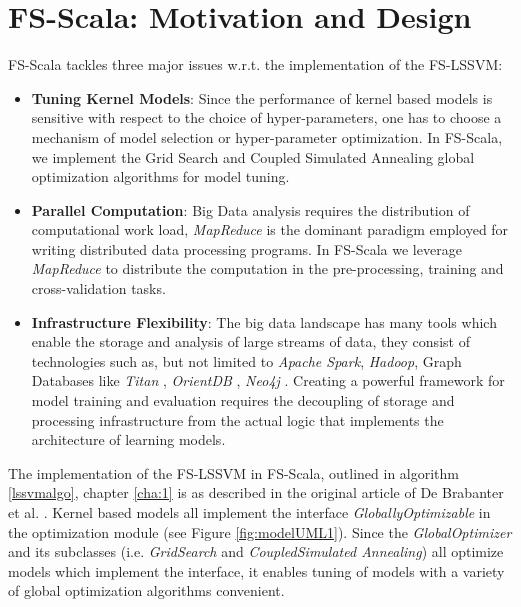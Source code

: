 \section{FS-Scala: Motivation and Design}
FS-Scala tackles three major issues w.r.t. the implementation of the FS-LSSVM:

\begin{itemize}
\item \textbf{Tuning Kernel Models}:
Since the performance of kernel based models is sensitive with respect to the choice of hyper-parameters, one has to choose a mechanism of model selection or hyper-parameter optimization. In FS-Scala, we implement the Grid Search and Coupled Simulated Annealing global optimization algorithms for model tuning.

\item \textbf{Parallel Computation}\label{mr}:
Big Data analysis requires the distribution of computational work load, \textit{MapReduce} is the dominant paradigm employed for writing distributed data processing programs. In FS-Scala we leverage \textit{MapReduce} to distribute the computation in the pre-processing, training and cross-validation tasks.

\item \textbf{Infrastructure Flexibility}:
The big data landscape has many tools which enable the storage and analysis of large streams of data, they consist of technologies such as, but not limited to \textit{Apache Spark}, \textit{Hadoop}, Graph Databases like \textit{Titan} \cite{Titan:2014}, \textit{OrientDB} \cite{OrientDB:2010}, \textit{Neo4j} \cite{Neo4j:2010}. Creating a powerful framework for model training and evaluation requires the decoupling of storage and processing infrastructure from the actual logic that implements the architecture of learning models.
\end{itemize}

The implementation of the FS-LSSVM in FS-Scala, outlined in algorithm \ref{lssvmalgo}, chapter \ref{cha:1} is as described in the original article of De Brabanter et al. \cite{DeBrabanter2010}. Kernel based models all implement the interface \textit{GloballyOptimizable} in the optimization module (see Figure \ref{fig:modelUML1}). Since the \textit{GlobalOptimizer} and its subclasses (i.e. \textit{GridSearch} and \textit{CoupledSimulated Annealing}) all optimize models which implement the  interface, it enables tuning of models with a variety of global optimization algorithms convenient.


